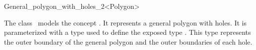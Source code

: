 \ccRefPageBegin

\begin{ccRefClass}{General_polygon_with_holes_2<Polygon>}

\ccThreeToTwo

\ccDefinition
The class \ccRefName\ models the concept .
It represents a general polygon with holes. It is parameterized with a
type  used to define the exposed type .
This type represents the outer boundary of the general polygon and the
outer boundaries of each hole.

 
\ccThreeToTwo


\ccIsModel

\end{ccRefClass}
\ccRefPageEnd

